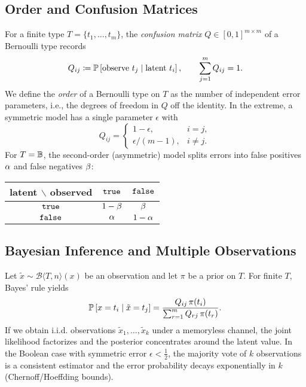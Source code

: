 \documentclass[11pt,final,hidelinks]{article}
\newcommand{\bernoulli}[2]{\mathcal{B}\langle #1, #2 \rangle}
\begin{document}
\subsection{Order and Confusion Matrices}

For a finite type $T=\{t_1,\dots,t_m\}$, the \emph{confusion matrix} $Q\in[0,1]^{m\times m}$ of a Bernoulli type records
\begin{equation}
    Q_{ij} \coloneqq \mathbb{P}\left[\text{observe } t_j \mid \text{latent } t_i\right], \qquad \sum_{j=1}^m Q_{ij}=1.
\end{equation}
We define the \emph{order} of a Bernoulli type on $T$ as the number of independent error parameters, i.e., the degrees of freedom in $Q$ off the identity. In the extreme, a symmetric model has a single parameter $\epsilon$ with
\begin{equation}
    Q_{ij}=\begin{cases}1-\epsilon,& i=j,\\[2pt] \epsilon/(m-1),& i\neq j.\end{cases}
\end{equation}
For $T=\mathbb{B}$, the second-order (asymmetric) model splits errors into false positives $\alpha$ and false negatives $\beta$:
\begin{center}
\begin{tabular}{c|cc}
latent $\backslash$ observed & $\mathtt{true}$ & $\mathtt{false}$ \\ \hline
$\mathtt{true}$ & $1-\beta$ & $\beta$ \\
$\mathtt{false}$ & $\alpha$ & $1-\alpha$
\end{tabular}
\end{center}

\subsection{Bayesian Inference and Multiple Observations}

Let $\tilde{x}\sim\bernoulli{T}{n}(x)$ be an observation and let $\pi$ be a prior on $T$. For finite $T$, Bayes' rule yields
\begin{equation}
    \mathbb{P}\left[x=t_i\mid \tilde{x}=t_j\right] = \frac{Q_{ij}\,\pi(t_i)}{\sum_{r=1}^m Q_{rj}\,\pi(t_r)}.
\end{equation}
If we obtain i.i.d. observations $\tilde{x}_1,\dots,\tilde{x}_k$ under a memoryless channel, the joint likelihood factorizes and the posterior concentrates around the latent value. In the Boolean case with symmetric error $\epsilon<\tfrac12$, the majority vote of $k$ observations is a consistent estimator and the error probability decays exponentially in $k$ (Chernoff/Hoeffding bounds).
\end{document}
